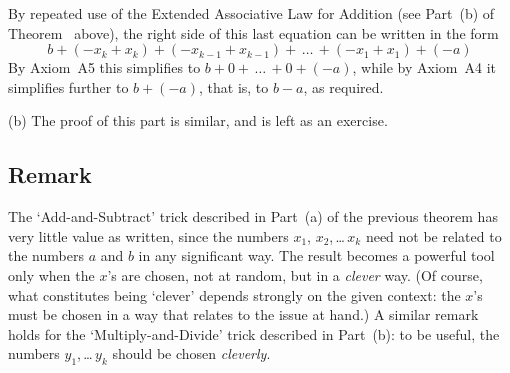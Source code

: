 {        By repeated use of the Extended Associative Law for Addition (see Part~(b) of Theorem~ above),
    the right side of this last equation can be written in the form
        \begin{displaymath}
        b + (-x_{k} + x_{k}) + (-x_{k-1} + x_{k-1}) + \,{\ldots}\, + (-x_{1} + x_{1}) + (-a)
        \end{displaymath}
    By Axiom~A5 this simplifies to $b + 0 + \,{\ldots}\, + 0 + (-a)$,
    while by Axiom~A4 it simplifies further to $b + (-a)$, that is, to $b-a$, as required.

\V

        (b) The proof of this part is similar, and is left as an exercise.

\V
        \subsection{\small{{\bf Remark}}}
        \label{RemrkB10.105}

        The `Add-and-Subtract' trick described in Part~(a) of the previous theorem has very little value as written,
    since the numbers $x_{1}$, $x_{2}$,\,{\ldots}\,$x_{k}$ need not be related to the numbers $a$ and $b$ in any significant way.
    The result becomes a powerful tool only when the $x$'s are chosen, not at random, but in a {\em clever} way.
    (Of course, what constitutes being `clever' depends strongly on the given context:
    the $x$'s must be chosen in a way that relates to the issue at hand.)
    A similar remark holds for the `Multiply-and-Divide' trick described in Part~(b): to be useful, the numbers $y_{1}$,\,{\ldots}\,$y_{k}$ should be chosen {\em cleverly}.

}%

